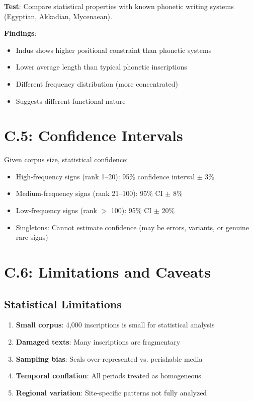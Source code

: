 \textbf{Test}: Compare statistical properties with known phonetic writing systems (Egyptian, Akkadian, Mycenaean).

\textbf{Findings}:
\begin{itemize}
    \item Indus shows higher positional constraint than phonetic systems
    \item Lower average length than typical phonetic inscriptions
    \item Different frequency distribution (more concentrated)
    \item Suggests different functional nature
\end{itemize}

\section*{C.5: Confidence Intervals}

Given corpus size, statistical confidence:

\begin{itemize}
    \item High-frequency signs (rank 1--20): 95\% confidence interval $\pm$ 3\%
    \item Medium-frequency signs (rank 21--100): 95\% CI $\pm$ 8\%
    \item Low-frequency signs (rank $>$ 100): 95\% CI $\pm$ 20\%
    \item Singletons: Cannot estimate confidence (may be errors, variants, or genuine rare signs)
\end{itemize}

\section*{C.6: Limitations and Caveats}

\subsection*{Statistical Limitations}

\begin{enumerate}
    \item \textbf{Small corpus}: 4,000 inscriptions is small for statistical analysis
    \item \textbf{Damaged texts}: Many inscriptions are fragmentary
    \item \textbf{Sampling bias}: Seals over-represented vs. perishable media
    \item \textbf{Temporal conflation}: All periods treated as homogeneous
    \item \textbf{Regional variation}: Site-specific patterns not fully analyzed
\end{enumerate}

